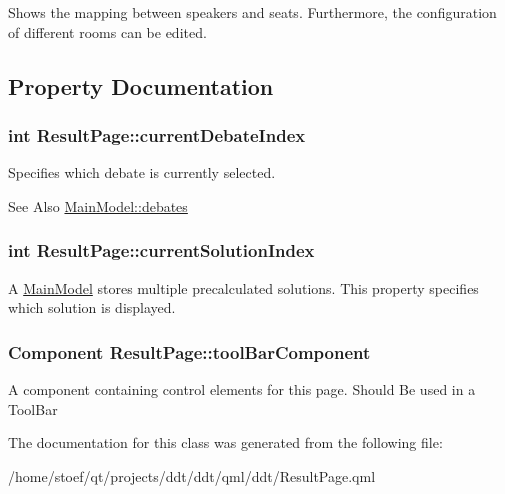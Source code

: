 Shows the mapping between speakers and seats. Furthermore, the configuration of different rooms can be edited. 

\subsection{Property Documentation}
\hypertarget{classResultPage_ac6459fe5c02bd49ed488b428a1d9d766}{
\subsubsection[{current\-Debate\-Index}]{\setlength{\rightskip}{0pt plus 5cm}int Result\-Page\-::current\-Debate\-Index}}\label{classResultPage_ac6459fe5c02bd49ed488b428a1d9d766}
Specifies which debate is currently selected. \begin{DoxySeeAlso}{See Also}
\hyperlink{classMainModel_ab61e1b1925f4dc1ae94cdcafc579e3fe}{Main\-Model\-::debates} 
\end{DoxySeeAlso}
\hypertarget{classResultPage_acfea637505034129528d4e4dcda06041}{
\subsubsection[{current\-Solution\-Index}]{\setlength{\rightskip}{0pt plus 5cm}int Result\-Page\-::current\-Solution\-Index}}\label{classResultPage_acfea637505034129528d4e4dcda06041}
A {\ttfamily \hyperlink{classMainModel}{Main\-Model}} stores multiple precalculated solutions. This property specifies which solution is displayed. \hypertarget{classResultPage_a4634d6af41a1cbf3f566b8dfa63ac67b}{
\subsubsection[{tool\-Bar\-Component}]{\setlength{\rightskip}{0pt plus 5cm}Component Result\-Page\-::tool\-Bar\-Component}}\label{classResultPage_a4634d6af41a1cbf3f566b8dfa63ac67b}
A component containing control elements for this page. Should Be used in a {\ttfamily Tool\-Bar} 

The documentation for this class was generated from the following file\-:\begin{DoxyCompactItemize}
\item 
/home/stoef/qt/projects/ddt/ddt/qml/ddt/Result\-Page.\-qml\end{DoxyCompactItemize}
